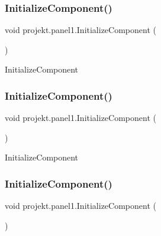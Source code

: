 \subsubsection{\texorpdfstring{Initialize\+Component()}{InitializeComponent()}\hspace{0.1cm}{\footnotesize\ttfamily [1/9]}}
{\footnotesize\ttfamily void projekt.\+panel1.\+Initialize\+Component (\begin{DoxyParamCaption}{ }\end{DoxyParamCaption})\hspace{0.3cm}{\ttfamily [inline]}}



Initialize\+Component 

\mbox{\label{classprojekt_1_1panel1_ac484186ff491641f3655f8ae2045bf54}} 
\subsubsection{\texorpdfstring{Initialize\+Component()}{InitializeComponent()}\hspace{0.1cm}{\footnotesize\ttfamily [2/9]}}
{\footnotesize\ttfamily void projekt.\+panel1.\+Initialize\+Component (\begin{DoxyParamCaption}{ }\end{DoxyParamCaption})\hspace{0.3cm}{\ttfamily [inline]}}



Initialize\+Component 

\mbox{\label{classprojekt_1_1panel1_ac484186ff491641f3655f8ae2045bf54}} 
\subsubsection{\texorpdfstring{Initialize\+Component()}{InitializeComponent()}\hspace{0.1cm}{\footnotesize\ttfamily [3/9]}}
{\footnotesize\ttfamily void projekt.\+panel1.\+Initialize\+Component (\begin{DoxyParamCaption}{ }\end{DoxyParamCaption})\hspace{0.3cm}{\ttfamily [inline]}}



